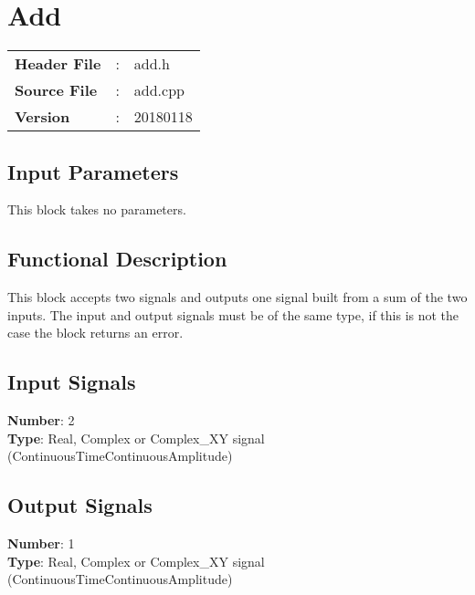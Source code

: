 \clearpage

\section{Add}

\begin{tcolorbox}	
\begin{tabular}{p{2.75cm} p{0.2cm} p{10.5cm}} 	
\textbf{Header File}   &:& add.h \\
\textbf{Source File}   &:& add.cpp \\
\textbf{Version}       &:& 20180118
\end{tabular}
\end{tcolorbox}

\subsection*{Input Parameters}

This block takes no parameters.

\subsection*{Functional Description}

This block accepts two signals and outputs one signal built from a sum of the two inputs. The input and output signals must be of the same type, if this is not the case the block returns an error.

\subsection*{Input Signals}

\textbf{Number}: 2\\
\textbf{Type}: Real, Complex or Complex\_XY signal (ContinuousTimeContinuousAmplitude)

\subsection*{Output Signals}

\textbf{Number}: 1\\
\textbf{Type}: Real, Complex or Complex\_XY signal (ContinuousTimeContinuousAmplitude)

%
